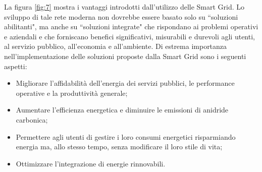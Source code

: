 \begin{figure}[h]
\end{figure}

La figura \ref{fig:7} mostra i vantaggi introdotti dall'utilizzo delle Smart Grid. Lo sviluppo di tale rete moderna non dovrebbe essere basato solo su ``soluzioni abilitanti", ma anche su ``soluzioni integrate" che rispondano ai problemi operativi e aziendali e che forniscano benefici significativi, misurabili e durevoli agli utenti, al servizio pubblico, all'economia e all'ambiente.
\newline 
Di estrema importanza nell'implementazione delle soluzioni proposte dalla Smart Grid sono i seguenti aspetti:
\begin{itemize}
\item Migliorare l'affidabilità dell'energia dei servizi pubblici, le performance operative e la produttività generale;
\item Aumentare l'efficienza energetica e diminuire le emissioni di anidride carbonica;
\item Permettere agli utenti di gestire i loro consumi energetici risparmiando energia ma, allo stesso tempo, senza modificare il loro stile di vita;
\item Ottimizzare l'integrazione di energie rinnovabili.
\end{itemize}

